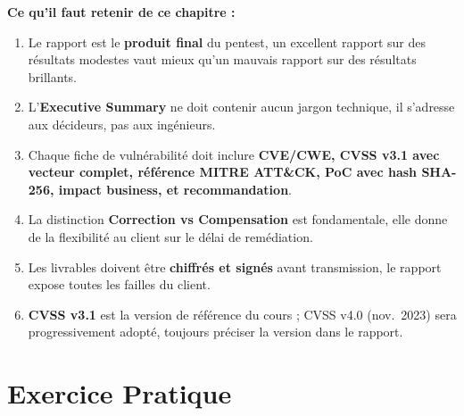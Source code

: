 \begin{boxinfo}
\textbf{Ce qu'il faut retenir de ce chapitre :}
\begin{enumerate}
    \item Le rapport est le \textbf{produit final} du pentest, un
          excellent rapport sur des résultats modestes vaut mieux qu'un
          mauvais rapport sur des résultats brillants.
    \item L'\textbf{Executive Summary} ne doit contenir aucun jargon
          technique, il s'adresse aux décideurs, pas aux ingénieurs.
    \item Chaque fiche de vulnérabilité doit inclure \textbf{CVE/CWE,
          CVSS v3.1 avec vecteur complet, référence MITRE ATT\&CK,
          PoC avec hash SHA-256, impact business, et recommandation}.
    \item La distinction \textbf{Correction vs Compensation} est
          fondamentale, elle donne de la flexibilité au client sur
          le délai de remédiation.
    \item Les livrables doivent être \textbf{chiffrés et signés} avant
          transmission, le rapport expose toutes les failles du client.
    \item \textbf{CVSS v3.1} est la version de référence du cours ;
          CVSS v4.0 (nov.~2023) sera progressivement adopté, toujours
          préciser la version dans le rapport.
\end{enumerate}
\end{boxinfo}

\section*{Exercice Pratique}

